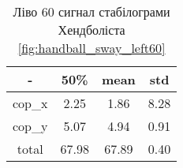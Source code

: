 \begin{table}[!ht]
    \centering
    \caption{Ліво 60 сигнал стабілограми Хендболіста \ref{fig:handball_sway_left60}}
    \label{tab:handball_sway_left60}

    \begin{tabular}{|c|c|c|c|}
        \toprule
        -      & 50\%  & mean  & std  \\

        \midrule
        cop\_x & 2.25  & 1.86  & 8.28 \\
        \hline
        cop\_y & 5.07  & 4.94  & 0.91 \\

        \bottomrule
        total  & 67.98 & 67.89 & 0.40 \\
        \hline
    \end{tabular}
\end{table}
